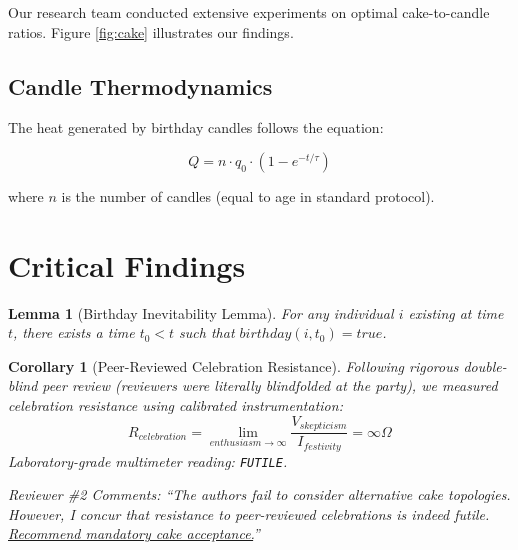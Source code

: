 \documentclass[12pt,a4paper]{article}
\newtheorem{lemma}[theorem]{Lemma}
\newtheorem{corollary}[theorem]{Corollary}
\begin{document}
Our research team conducted extensive experiments on optimal cake-to-candle ratios. Figure \ref{fig:cake} illustrates our findings.

\begin{center}
\end{center}

\subsection{Candle Thermodynamics}

The heat generated by birthday candles follows the equation:

\begin{equation}
Q = n \cdot q_0 \cdot \left(1 - e^{-t/\tau}\right)
\end{equation}

where $n$ is the number of candles (equal to age in standard protocol).

\section{Critical Findings}

\begin{lemma}[Birthday Inevitability Lemma]
For any individual $i$ existing at time $t$, there exists a time $t_0 < t$ such that $birthday(i, t_0) = true$.
\end{lemma}

\begin{corollary}[Peer-Reviewed Celebration Resistance]
Following rigorous double-blind peer review (reviewers were literally blindfolded at the party), we measured celebration resistance using calibrated instrumentation:
\begin{equation}
R_{celebration} = \lim_{enthusiasm \to \infty} \frac{V_{skepticism}}{I_{festivity}} = \infty \Omega
\end{equation}
Laboratory-grade multimeter reading: \texttt{FUTILE}. 

\textit{Reviewer \#2 Comments:} ``The authors fail to consider alternative cake topologies. However, I concur that resistance to peer-reviewed celebrations is indeed futile. \ul{Recommend mandatory cake acceptance.}''
\end{corollary}
\end{document}
